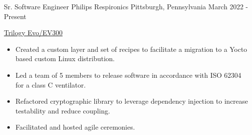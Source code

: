 

\begin{cventries}

\cventry
  {Sr. Software Engineer} %
  {Philips Respironics} %
  {Pittsburgh, Pennsylvania} %
  {March 2022 - Present} %
  {
    \begin{cvitems}
    \item
    {
      \href{https://www.usa.philips.com/healthcare/product/HC0055500/trilogy-evo-portable-hospital-to-home-ventilator}{\color{RoyalBlue}Trilogy Evo/EV300}
      \begin{itemize}
        \item Created a custom layer and set of recipes to facilitate a migration to a Yocto based custom Linux distribution.
        \item Led a team of 5 members to release software in accordance with ISO 62304 for a class C ventilator.
        \item Refactored cryptographic library to leverage dependency injection to increase testability and reduce coupling.
        \item Facilitated and hosted agile ceremonies.
      \end{itemize}
    }
    \end{cvitems}
  }


\end{cventries}
